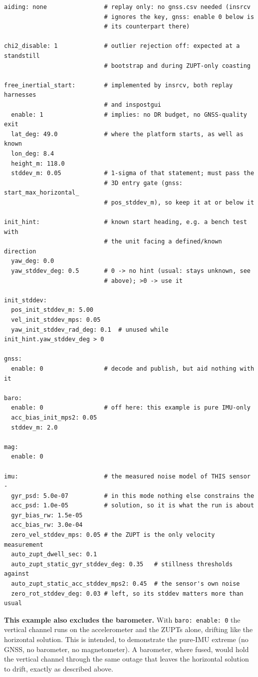 \documentclass[11pt,a4paper]{article}
\newcommand{\code}[1]{\texttt{#1}}
\begin{document}
\begin{lstlisting}[style=cfg]
aiding: none                # replay only: no gnss.csv needed (insrcv
                            # ignores the key, gnss: enable 0 below is
                            # its counterpart there)

chi2_disable: 1             # outlier rejection off: expected at a standstill
                            # bootstrap and during ZUPT-only coasting

free_inertial_start:        # implemented by insrcv, both replay harnesses
                            # and inspostgui
  enable: 1                 # implies: no DR budget, no GNSS-quality exit
  lat_deg: 49.0             # where the platform starts, as well as known
  lon_deg: 8.4
  height_m: 118.0
  stddev_m: 0.05            # 1-sigma of that statement; must pass the
                            # 3D entry gate (gnss: start_max_horizontal_
                            # pos_stddev_m), so keep it at or below it

init_hint:                  # known start heading, e.g. a bench test with
                            # the unit facing a defined/known direction
  yaw_deg: 0.0
  yaw_stddev_deg: 0.5       # 0 -> no hint (usual: stays unknown, see
                            # above); >0 -> use it

init_stddev:
  pos_init_stddev_m: 5.00
  vel_init_stddev_mps: 0.05
  yaw_init_stddev_rad_deg: 0.1  # unused while init_hint.yaw_stddev_deg > 0

gnss:
  enable: 0                 # decode and publish, but aid nothing with it

baro:
  enable: 0                 # off here: this example is pure IMU-only
  acc_bias_init_mps2: 0.05
  stddev_m: 2.0

mag:
  enable: 0

imu:                        # the measured noise model of THIS sensor -
  gyr_psd: 5.0e-07          # in this mode nothing else constrains the
  acc_psd: 1.0e-05          # solution, so it is what the run is about
  gyr_bias_rw: 1.5e-05
  acc_bias_rw: 3.0e-04
  zero_vel_stddev_mps: 0.05 # the ZUPT is the only velocity measurement
  auto_zupt_dwell_sec: 0.1
  auto_zupt_static_gyr_stddev_deg: 0.35   # stillness thresholds against
  auto_zupt_static_acc_stddev_mps2: 0.45  # the sensor's own noise
  zero_rot_stddev_deg: 0.03 # left, so its stddev matters more than usual
\end{lstlisting}

\noindent\textbf{This example also excludes the barometer.} With
\code{baro: enable: 0} the vertical channel runs on the accelerometer and
the ZUPTs alone, drifting like the horizontal solution. This is intended, to
demonstrate the pure-IMU extreme (no GNSS, no barometer, no magnetometer).
A barometer, where fused, would hold the vertical channel through the same
outage that leaves the horizontal solution to drift, exactly as described
above.
\end{document}
